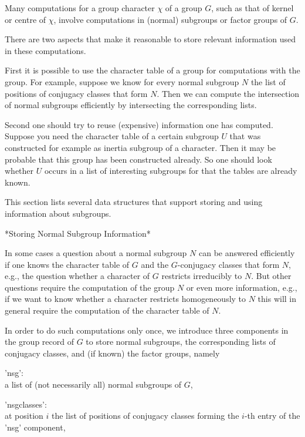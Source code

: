 
Many computations for a group character $\chi$ of a group $G$, such as that
of kernel or centre of $\chi$, involve computations in (normal) subgroups or
factor groups of $G$.

There are two aspects that make it reasonable to store relevant information
used in these computations.

First it is possible to use the character table of a group for computations
with the group.  For example, suppose we know for every normal subgroup $N$
the list of positions of conjugacy classes that form $N$.  Then we can
compute the intersection of normal subgroups efficiently by intersecting
the corresponding lists.

Second one should try to reuse (expensive) information one has computed.
Suppose you need the character table of a certain subgroup $U$ that was
constructed for example as inertia subgroup of a character.  Then it may be
probable that this group has been constructed already.  So one should look
whether $U$ occurs in a list of interesting subgroups for that the tables
are already known.

This section lists several data structures that support storing and using
information about subgroups.

\vspace{5mm}

*Storing Normal Subgroup Information*

In some cases a question about a normal subgroup $N$ can be answered
efficiently if one knows the character table of $G$ and the $G$-conjugacy
classes that form $N$, e.g., the question whether a character of $G$
restricts irreducibly to $N$.
But other questions require the computation of the group $N$ or even more
information, e.g., if we want to know whether a character restricts
homogeneously to $N$ this will in general require the computation of the
character table of $N$.

In order to do such computations only once, we introduce three components
in the group record of $G$ to store normal subgroups, the corresponding
lists of conjugacy classes, and (if known) the factor groups, namely

'nsg': \\        a list of (not necessarily all) normal subgroups of $G$,

'nsgclasses': \\ at position $i$ the list of positions of conjugacy
                 classes forming the $i$-th entry of the 'nsg' component,


